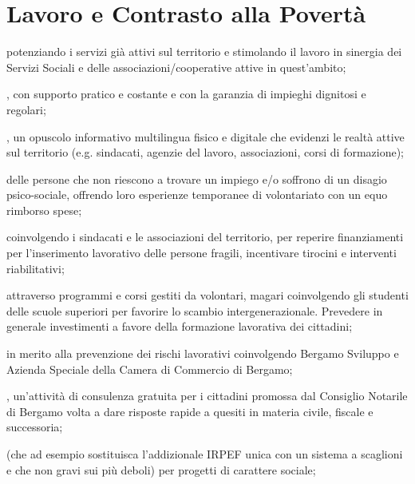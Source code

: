 \section{Lavoro e Contrasto alla Povertà}
 potenziando i servizi già attivi sul territorio e stimolando il lavoro in sinergia dei Servizi Sociali e delle associazioni/cooperative attive in quest'ambito;

, con supporto pratico e costante e con la garanzia di impieghi dignitosi e regolari; 

, un opuscolo informativo multilingua fisico e digitale che evidenzi le realtà attive sul territorio (e.g. sindacati, agenzie del lavoro, associazioni, corsi di formazione);

 delle persone che non riescono a trovare un impiego e/o soffrono di un disagio psico-sociale, offrendo loro esperienze temporanee di volontariato con un equo rimborso spese;

 coinvolgendo i sindacati e le associazioni del territorio, per reperire finanziamenti per l'inserimento lavorativo delle persone fragili, incentivare tirocini e interventi riabilitativi;

 attraverso programmi e corsi gestiti da volontari, magari coinvolgendo gli studenti delle scuole superiori per favorire lo scambio intergenerazionale. Prevedere in generale investimenti a favore della formazione lavorativa dei cittadini;

 in merito alla  prevenzione dei rischi lavorativi coinvolgendo  Bergamo Sviluppo e Azienda Speciale della Camera di Commercio di Bergamo;

, un'attività di consulenza gratuita per i cittadini promossa dal Consiglio Notarile di Bergamo volta a dare risposte rapide a quesiti in materia civile, fiscale e successoria;

\pagebreak
\begin{samepage}
 (che ad esempio sostituisca l'addizionale IRPEF unica con un sistema a scaglioni e che non gravi sui più deboli) per progetti di carattere sociale;
\end{samepage}

